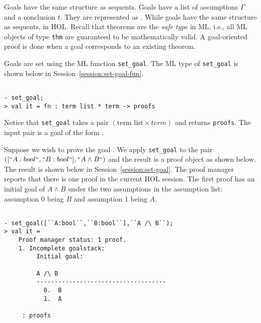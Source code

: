 Goals have the same structure as sequents.  Goals have a list of
assumptions $\Gamma$ and a conclusion $t$.  They are represented as
. While goals have the same structure as sequents,
\textbf{} in HOL. Recall that theorems
 are the \emph{safe type} in ML, i.e., all ML objects
of type \texttt{thm} are guaranteed to be mathematically valid. A
goal-oriented proof is done when a goal corresponds to an existing
theorem.

Goals are set using the ML function \texttt{set\_goal}.  The ML type
of \texttt{set\_goal} is shown below in
Session~\ref{session:set-goal-fun}. 
\begin{session}
\label{session:set-goal-fun}
  \begin{scriptsize}
\begin{verbatim}

- set_goal;
> val it = fn : term list * term -> proofs
\end{verbatim}
  \end{scriptsize}
\end{session}
Notice that \texttt{set\_goal} takes a pair $(\text{term list} \times
term)$ and returns \texttt{proofs}. The input pair is a goal of the
form .

Suppose we wish to prove the goal . We apply
\texttt{set\_goal} to the pair $([``A:bool``,``B:bool``],``A \wedge
B``)$ and the result is a proof object as shown below. The result is
shown below in Session~\ref{session:set-goal}. The proof manager reports that
there is one proof in the current HOL session. The first proof has an
initial goal of $A \wedge B$ under the two assumptions in the
assumption list: assumption 0 being $B$ and assumption 1 being $A$.
\begin{session}
\label{session:set-goal}
  \begin{scriptsize}
\begin{verbatim}

- set_goal([``A:bool``,``B:bool``],``A /\ B``);
> val it =
    Proof manager status: 1 proof.
    1. Incomplete goalstack:
         Initial goal:
         
         A /\ B
         ------------------------------------
           0.  B
           1.  A
         
     : proofs
\end{verbatim}
  \end{scriptsize}
\end{session}

